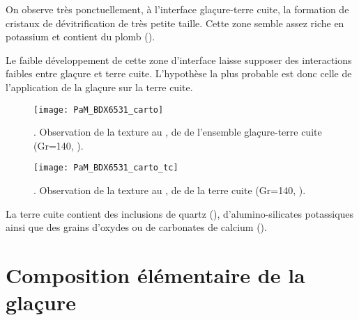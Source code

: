 On observe très ponctuellement, à l'interface glaçure-terre cuite, la 
formation de cristaux de dévitrification de très petite taille. Cette 
zone semble assez riche en potassium et contient du plomb 
().

Le faible développement de cette zone d'interface laisse supposer des 
interactions faibles entre glaçure et terre cuite. L'hypothèse la plus 
probable est donc celle de l'application de la glaçure sur la terre 
cuite.

\begin{figure}[htb]
  \texttt{[image: PaM\_BDX6531\_carto]}%
  \caption[\ -- Observation de la texture au \MEB, 
           \carto de \RX de l'ensemble glaçure-terre cuite]
          {\legendeD.
           Observation de la texture au \MEB, 
           \carto de \RX de l'ensemble glaçure-terre cuite 
           (Gr=140, ).}
  \label{MEB:6531_carto_tcgla}
\end{figure}

\begin{figure}[htb]
  \texttt{[image: PaM\_BDX6531\_carto\_tc]}%
  \caption[\ -- Observation de la texture au \MEB, 
           \carto de \RX de la terre cuite]
          {\legendeD.
           Observation de la texture au \MEB, 
           \carto de \RX de la terre cuite 
           (Gr=140, ).}
  \label{MEB:6531_carto_tc}
\end{figure}

La terre cuite contient des inclusions de quartz (\quartz), 
d'alumino-silicates potassiques ainsi que des grains d'oxydes ou de 
carbonates de calcium ().


\section{Composition élémentaire de la glaçure}

